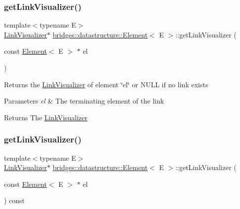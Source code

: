 \subsubsection{\texorpdfstring{get\+Link\+Visualizer()}{getLinkVisualizer()}\hspace{0.1cm}{\footnotesize\ttfamily [1/2]}}
{\footnotesize\ttfamily template$<$typename E$>$ \\
\hyperlink{classbridges_1_1datastructure_1_1_link_visualizer}{Link\+Visualizer}$\ast$ \hyperlink{classbridges_1_1datastructure_1_1_element}{bridges\+::datastructure\+::\+Element}$<$ E $>$\+::get\+Link\+Visualizer (\begin{DoxyParamCaption}\item[{const \hyperlink{classbridges_1_1datastructure_1_1_element}{Element}$<$ E $>$ $\ast$}]{el }\end{DoxyParamCaption})\hspace{0.3cm}{\ttfamily [inline]}}

Returns the \hyperlink{classbridges_1_1datastructure_1_1_link_visualizer}{Link\+Visualizer} of element \char`\"{}el\char`\"{} or N\+U\+LL if no link exists


\begin{DoxyParams}{Parameters}
{\em el} & The terminating element of the link\\
\hline
\end{DoxyParams}
\begin{DoxyReturn}{Returns}
The \hyperlink{classbridges_1_1datastructure_1_1_link_visualizer}{Link\+Visualizer} 
\end{DoxyReturn}
\mbox{\label{classbridges_1_1datastructure_1_1_element_a5e3b55d5098d72d4a83b68a60584a3a1}} 
\subsubsection{\texorpdfstring{get\+Link\+Visualizer()}{getLinkVisualizer()}\hspace{0.1cm}{\footnotesize\ttfamily [2/2]}}
{\footnotesize\ttfamily template$<$typename E$>$ \\
\hyperlink{classbridges_1_1datastructure_1_1_link_visualizer}{Link\+Visualizer}$\ast$ \hyperlink{classbridges_1_1datastructure_1_1_element}{bridges\+::datastructure\+::\+Element}$<$ E $>$\+::get\+Link\+Visualizer (\begin{DoxyParamCaption}\item[{const \hyperlink{classbridges_1_1datastructure_1_1_element}{Element}$<$ E $>$ $\ast$}]{el }\end{DoxyParamCaption}) const\hspace{0.3cm}{\ttfamily [inline]}}

